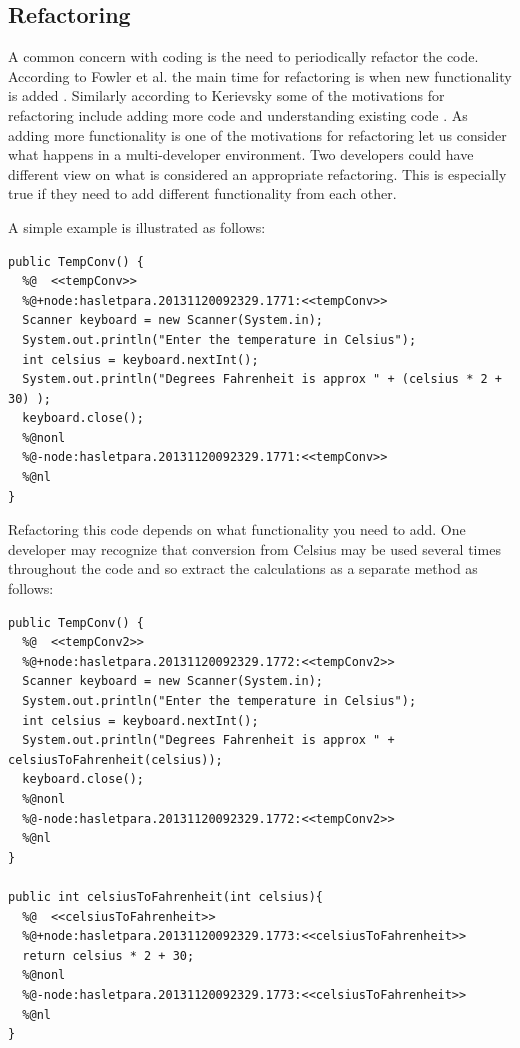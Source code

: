 \documentclass[12pt]{CRPITStyle}
\renewcommand{\cite}{\citep}
\begin{document}
\subsection{Refactoring}
A common concern with coding is the need to periodically refactor the code. According to Fowler et al. the main time for refactoring is when new functionality is added \cite{Fowler1999}. Similarly according to Kerievsky some of the motivations for refactoring include adding more code and understanding existing code \cite{Kerievsky2004}. As adding more functionality is one of the motivations for refactoring let us consider what happens in a multi-developer environment. Two developers could have different view on what is considered an appropriate refactoring. This is especially true if they need to add different functionality from each other. 


A simple example is illustrated as follows:
\begin{verbatim}
public TempConv() {
  %@  <<tempConv>>
  %@+node:hasletpara.20131120092329.1771:<<tempConv>>
  Scanner keyboard = new Scanner(System.in);
  System.out.println("Enter the temperature in Celsius");
  int celsius = keyboard.nextInt();
  System.out.println("Degrees Fahrenheit is approx " + (celsius * 2 + 30) );
  keyboard.close();
  %@nonl
  %@-node:hasletpara.20131120092329.1771:<<tempConv>>
  %@nl
}
\end{verbatim}

Refactoring this code depends on what functionality you need to add. One developer may recognize that conversion from Celsius may be used several times throughout the code and so extract the calculations as a separate method as follows:

\begin{verbatim}
public TempConv() {
  %@  <<tempConv2>>
  %@+node:hasletpara.20131120092329.1772:<<tempConv2>>
  Scanner keyboard = new Scanner(System.in);
  System.out.println("Enter the temperature in Celsius");
  int celsius = keyboard.nextInt();
  System.out.println("Degrees Fahrenheit is approx " + celsiusToFahrenheit(celsius));
  keyboard.close();
  %@nonl
  %@-node:hasletpara.20131120092329.1772:<<tempConv2>>
  %@nl
}

public int celsiusToFahrenheit(int celsius){
  %@  <<celsiusToFahrenheit>>
  %@+node:hasletpara.20131120092329.1773:<<celsiusToFahrenheit>>
  return celsius * 2 + 30;
  %@nonl
  %@-node:hasletpara.20131120092329.1773:<<celsiusToFahrenheit>>
  %@nl
}
\end{verbatim}
\end{document}
